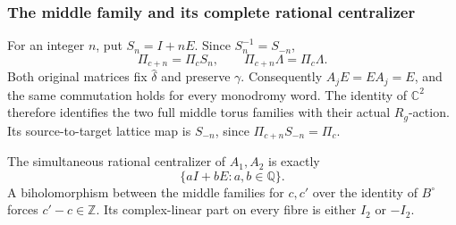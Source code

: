 \subsubsection{The middle family and its complete rational centralizer}

For an integer $n$, put $S_n=I+nE$. Since $S_n^{-1}=S_{-n}$,
\[
 \Pi_{c+n}=\Pi_c S_n,\qquad
 \Pi_{c+n}\Lambda=\Pi_c\Lambda.
 \tag{PS6}\label{pshift:eq:integer-shear}
\]
Both original matrices fix $\widehat\delta$ and preserve $\gamma$.
Consequently $A_jE=EA_j=E$, and the same commutation holds for every
monodromy word. The identity of $\mathbb C^2$ therefore identifies
the two full middle torus families with their actual $R_g$-action.
Its source-to-target lattice map is $S_{-n}$, since
$\Pi_{c+n}S_{-n}=\Pi_c$.

\begin{cited}\label{pshift:lem:centralizer}
The simultaneous rational centralizer of $A_1,A_2$ is exactly
\[
 \{aI+bE:a,b\in\mathbb Q\}.
 \tag{PS7}\label{pshift:eq:centralizer}
\]
A biholomorphism between the middle families for $c,c'$ over the
identity of $B^\circ$ forces $c'-c\in\mathbb Z$. Its complex-linear
part on every fibre is either $I_2$ or $-I_2$.
\end{cited}



